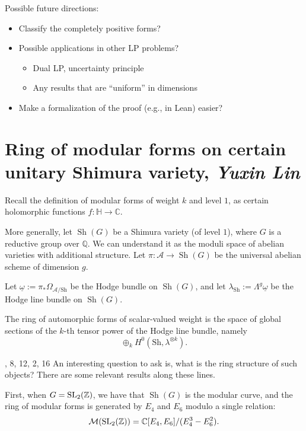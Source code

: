 \documentclass[reqno]{amsart} 
\begin{document}
Possible future directions:
\begin{itemize}
\item Classify the completely positive forms?
\item Possible applications in other LP problems?
  \begin{itemize}
  \item Dual LP, uncertainty principle
  \item Any results that are ``uniform'' in dimensions
  \end{itemize}
\item Make a formalization of the proof (e.g., in Lean) easier?
\end{itemize}

\section{Ring of modular forms on certain unitary Shimura variety, \textnormal{\emph{Yuxin Lin }}}

Recall the definition of modular forms of weight $k$ and level $1$, as certain holomorphic functions $f : \mathbb{H} \rightarrow \mathbb{C}$.

More generally, let $\operatorname{Sh}(G)$ be a Shimura variety (of level $1$), where $G$ is a reductive group over $\mathbb{Q}$.  We can understand it as the moduli space of abelian varieties with additional structure.  Let $\pi : \mathcal{A} \rightarrow \operatorname{Sh}(G)$ be the universal abelian scheme of dimension $g$.

Let $\underline{\omega} := \pi_\ast \Omega_{\mathcal{A} / \mathrm{Sh}}$ be the Hodge bundle on $\operatorname{Sh}(G)$, and let $\lambda_{\mathrm{Sh}} := \Lambda^g \underline{\omega}$ be the Hodge line bundle on $\operatorname{Sh}(G)$.

\begin{definition}
  The ring of automorphic forms of scalar-valued weight is the space of global sections of the $k$-th tensor power of the Hodge line bundle, namely
  \begin{equation*}
    \oplus_k H^0(\mathrm{Sh}, \lambda^{\otimes k}).
  \end{equation*}
\end{definition}, 8, 12, 2, 16
An interesting question to ask is, what is the ring structure of such objects?  There are some relevant results along these lines.

First, when $G = \operatorname{SL}_2(\mathbb{Z})$, we have that $\operatorname{Sh}(G)$ is the modular curve, and the ring of modular forms is generated by $E_4$ and $E_6$ modulo a single relation:
\begin{equation*}
  \mathcal{M}(\operatorname{SL}_2(\mathbb{Z})) = \mathbb{C}[E_4, E_6] /(E_4^3 - E_6^2).
\end{equation*}
\end{document}
